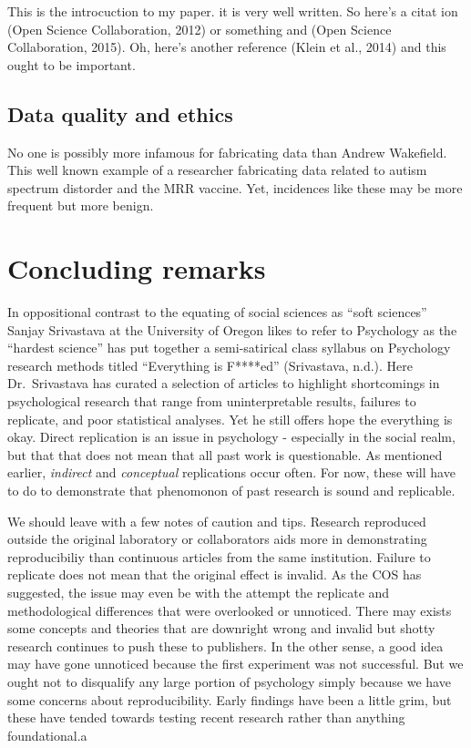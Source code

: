 \documentclass[man]{apa6}
\theoremstyle{definition}
\theoremstyle{definition}
\theoremstyle{definition}
\theoremstyle{remark}
\begin{document}
This is the introcuction to my paper. it is very well written. So here's
a citat ion (Open Science Collaboration, 2012) or something and (Open
Science Collaboration, 2015). Oh, here's another reference (Klein et
al., 2014) and this ought to be important.

\hypertarget{data-quality-and-ethics}{%
\subsection{Data quality and ethics}\label{data-quality-and-ethics}}

No one is possibly more infamous for fabricating data than Andrew
Wakefield. This well known example of a researcher fabricating data
related to autism spectrum distorder and the MRR vaccine. Yet,
incidences like these may be more frequent but more benign.

\hypertarget{concluding-remarks}{%
\section{Concluding remarks}\label{concluding-remarks}}

In oppositional contrast to the equating of social sciences as
\enquote{soft sciences} Sanjay Srivastava at the University of Oregon
likes to refer to Psychology as the \enquote{hardest science} has put
together a semi-satirical class syllabus on Psychology research methods
titled \enquote{Everything is F****ed} (Srivastava, n.d.). Here
Dr.~Srivastava has curated a selection of articles to highlight
shortcomings in psychological research that range from uninterpretable
results, failures to replicate, and poor statistical analyses. Yet he
still offers hope the everything is okay. Direct replication is an issue
in psychology - especially in the social realm, but that that does not
mean that all past work is questionable. As mentioned earlier,
\emph{indirect} and \emph{conceptual} replications occur often. For now,
these will have to do to demonstrate that phenomonon of past research is
sound and replicable.

We should leave with a few notes of caution and tips. Research
reproduced outside the original laboratory or collaborators aids more in
demonstrating reproducibiliy than continuous articles from the same
institution. Failure to replicate does not mean that the original effect
is invalid. As the COS has suggested, the issue may even be with the
attempt the replicate and methodological differences that were
overlooked or unnoticed. There may exists some concepts and theories
that are downright wrong and invalid but shotty research continues to
push these to publishers. In the other sense, a good idea may have gone
unnoticed because the first experiment was not successful. But we ought
not to disqualify any large portion of psychology simply because we have
some concerns about reproducibility. Early findings have been a little
grim, but these have tended towards testing recent research rather than
anything foundational.a
\end{document}
